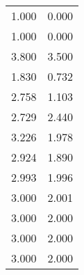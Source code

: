 
\begin{table}[h]
\centering
\begin{tabular}{cc}
1.000	&	0.000	 \\ 
1.000	&	0.000	 \\ 
3.800	&	3.500	 \\ 
1.830	&	0.732	 \\ 
2.758	&	1.103	 \\ 
2.729	&	2.440	 \\ 
3.226	&	1.978	 \\ 
2.924	&	1.890	 \\ 
2.993	&	1.996	 \\ 
3.000	&	2.001	 \\ 
3.000	&	2.000	 \\ 
3.000	&	2.000	 \\ 
3.000	&	2.000	 \\ 
\end{tabular}
\end{table}
